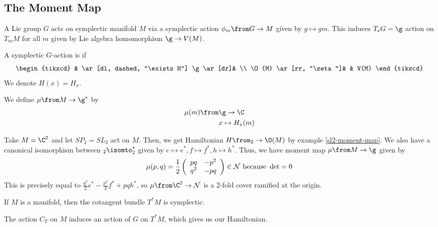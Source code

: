 \subsection{The Moment Map}
\begin{prop}
  A Lie group \(G\) acts on symplectic manifold \(M\) via a symplectic
  action \(\phi_m \from G \to M\) given by \(g \mapsto gm\). This
  induces \(T_e G = \g\) action on \(T_m M\) for all \(m\) given by
  Lie algebra homomorphism \(\g \to V(M)\). 
\end{prop}
\begin{defn}
  A symplectic \(G\)-action is  if \[
    \begin{tikzcd}
      & \ar[dl, dashed, "\exists H"] \g \ar[dr]& \\
      \O(M) \ar[rr, "\zeta"]& & V(M)
    \end{tikzcd}
  \]
  We denote \(H(x) = H_x\).
\end{defn}
\begin{defn}
  We define  \(\mu \from M \to \g^*\) by
  \begin{align*}
    \mu(m) \from & \g \to \C \\
    & x \mapsto H_x(m)
  \end{align*}
\end{defn}
\begin{example}
  Take \(M = \C^2\) and let \(SP_2 = SL_2\) act on \(M\). Then, we get
  Hamiltonian \(H \from \sl_2 \to \O(M)\) by example
  \ref{sl2-moment-map}. We also have a canonical isomorphism between
  \(\sl_2 \isomto \sl_2^*\) given by \(e \mapsto e^*, f \mapsto f^*, h
  \mapsto h^*\). Thus, we have moment map \(\mu \from M \to \g\)
  given by \[
    \mu(p,q) = \frac{1}{2} \left(
      \begin{array}{cc}
        pq&-p^2 \\
        q^2&-pq
      \end{array}
  \right) \in \mathcal{N} \text{ because }\det = 0
  \]
  This is precisely equal to \(\frac{q^2}{2}e^* - \frac{p^2}{2}f^* +
  pqh^*\), so \(\mu \from \C^2 \to \cN\) is a 2-fold cover ramified at
  the origin. 
\end{example}
\begin{prop}
  If \(M\) is a manifold, then the cotangent bundle \(T^*M\) is
  symplectic. 
\end{prop}
\begin{prop}
  The action \(C_T\) on \(M\) induces an action of \(G\) on \(T^* M\),
  which gives us our Hamiltonian. 
\end{prop}
